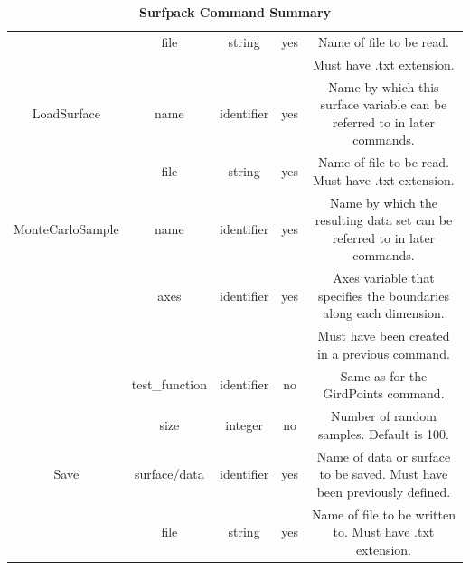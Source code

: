 \documentclass{article}
\begin{document}
\begin{table}
\begin{tabular}{|c|c|c|c|c|}
    & file & string & yes & Name of file to be read.\\
    & & & & Must have .txt extension.\\
    \hline
    LoadSurface & name & identifier & yes & Name by which
    this surface variable can be referred to in later commands.\\
    \hline
    & file & string & yes & Name of file to be read.  Must have .txt
    extension.\\
    \hline
    MonteCarloSample & name & identifier & yes & Name by
    which the resulting data set can be referred to in later commands.\\
    \hline
    & axes & identifier & yes & Axes variable that specifies the
    boundaries along each dimension.\\
    & & & & Must have been created in a previous command.\\
    \hline
    & test\_function & identifier & no & Same as for the
    GirdPoints command.\\
    \hline
    & size & integer & no & Number of random samples.  Default is
    100.\\
    \hline
    Save & surface/data & identifier & yes & Name of data or
    surface to be saved.  Must have been previously defined.\\
    \hline
    & file & string & yes & Name of file to be written to.  Must have .txt
    extension.\\
    \hline
  \end{tabular}
  \caption{\textbf{Surfpack Command Summary}}
\end{table}
\end{document}
